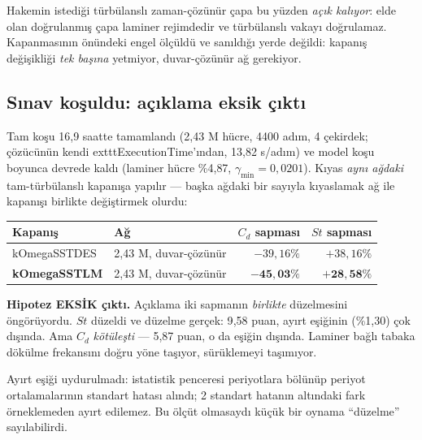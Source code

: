 \documentclass[11pt,a4paper]{article}
\begin{document}
\noindent Hakemin istediği türbülanslı zaman-çözünür çapa bu yüzden
\emph{açık kalıyor}: elde olan doğrulanmış çapa laminer rejimdedir ve
türbülanslı vakayı doğrulamaz. Kapanmasının önündeki engel ölçüldü ve
sanıldığı yerde değildi: kapanış değişikliği \emph{tek başına} yetmiyor,
duvar-çözünür ağ gerekiyor.

\subsection{Sınav koşuldu: açıklama eksik çıktı}
\label{sub:gecis-sonuc}

Tam koşu 16{,}9 saatte tamamlandı (2{,}43 M hücre, 4400 adım, 4 çekirdek; çözücünün kendi 	exttt{ExecutionTime}'ından, 13{,}82 s/adım) ve
model koşu boyunca devrede kaldı (laminer hücre \%4{,}87, $\gamma_{\min}=0{,}0201$).
Kıyas \emph{aynı ağdaki} tam-türbülanslı kapanışa yapılır --- başka ağdaki bir
sayıyla kıyaslamak ağ ile kapanışı birlikte değiştirmek olurdu:

\begin{center}\footnotesize
\begin{tabular}{@{}llrr@{}}
\toprule
Kapanış & Ağ & $C_d$ sapması & $St$ sapması \\
\midrule
kOmegaSSTDES & 2{,}43 M, duvar-çözünür & $-39{,}16\%$ & $+38{,}16\%$ \\
\textbf{kOmegaSSTLM} & 2{,}43 M, duvar-çözünür & $\mathbf{-45{,}03\%}$ & $\mathbf{+28{,}58\%}$ \\
\bottomrule
\end{tabular}
\end{center}

\noindent \textbf{Hipotez EKSİK çıktı.} Açıklama iki sapmanın \emph{birlikte}
düzelmesini öngörüyordu. $St$ düzeldi ve düzelme gerçek: 9{,}58 puan, ayırt
eşiğinin (\%1{,}30) çok dışında. Ama $C_d$ \emph{kötüleşti} --- 5{,}87 puan,
o da eşiğin dışında. Laminer bağlı tabaka dökülme frekansını doğru yöne
taşıyor, sürüklemeyi taşımıyor.

Ayırt eşiği uydurulmadı: istatistik penceresi periyotlara bölünüp periyot
ortalamalarının standart hatası alındı; 2 standart hatanın altındaki fark
örneklemeden ayırt edilemez. Bu ölçüt olmasaydı küçük bir oynama ``düzelme''
sayılabilirdi.
\end{document}
